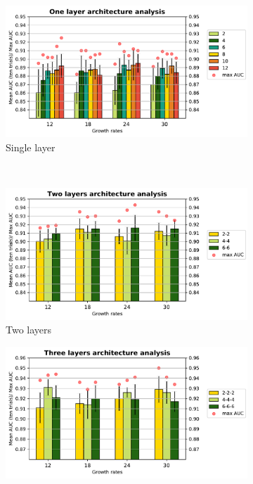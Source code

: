 \flushbottom
\newpage

\begin{figure}
  \centering
  \begin{subfigure}[b]{7cm}
    \includegraphics[width=\textwidth]{images/densenet/simple/densenet_simple_single_layer_bar}
    \caption{Single layer }
    \label{fig:densenet_simple_single_layer_bar}
  \end{subfigure}
  ~ %
  \begin{subfigure}[b]{7cm}
    \includegraphics[width=\textwidth]{images/densenet/simple/densenet_simple_double_layer_bar}
    \caption{Two layers}
    \label{fig:densenet_simple_double_layer_bar}
  \end{subfigure}  
  \quad
  \centering
  \begin{subfigure}[b]{7cm}
    \includegraphics[width=\textwidth]{images/densenet/simple/densenet_simple_three_layer_bar}

\end{subfigure}
\end{figure}
